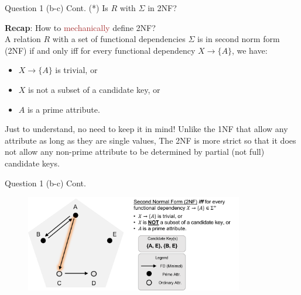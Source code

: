 \begin{frame}[fragile]{Question 1 (b-c) Cont.}
(*) Is $R$ with $\Sigma$ in 2NF?\\\vspace{10pt}

\textbf{Recap}: How to \textcolor{brown}{mechanically} define 2NF?\\\vspace{10pt}
A relation $R$ with a set of functional dependencies $\Sigma$ is in second norm form (2NF) if and only iff for every functional dependency $X\rightarrow\{A\}$, we have:
\begin{itemize}
	\item $X\rightarrow\{A\}$ is trivial, or
	\item $X$ is not a subset of a candidate key, or
	\item $A$ is a prime attribute.
\end{itemize}\vspace{10pt}

\begin{alertblock}{Just to understand, no need to keep it in mind!}
	Unlike the 1NF that allow any attribute as long as they are single values, 
	The 2NF is more strict so that it does not allow any non-prime attribute to be determined by partial (not full) candidate keys.
\end{alertblock}

\end{frame}

\begin{frame}[fragile]{Question 1 (b-c) Cont.}
\begin{figure}
	\includegraphics[width=0.85\textwidth, trim=0 0 0 0, clip]{t5/images/q3_2nf_highlight.png}
\end{figure}
\end{frame}

